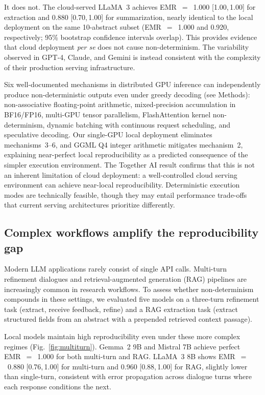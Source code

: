 \documentclass[sn-nature]{sn-jnl}
\begin{document}
It does not.
The cloud-served LLaMA~3 achieves EMR~$=$~1.000 [1.00,\,1.00] for extraction and 0.880 [0.70,\,1.00] for summarization, nearly identical to the local deployment on the same 10-abstract subset (EMR~$=$~1.000 and 0.920, respectively; 95\% bootstrap confidence intervals overlap).
This provides evidence that cloud deployment \emph{per se} does not cause non-determinism. The variability observed in GPT-4, Claude, and Gemini is instead consistent with the complexity of their production serving infrastructure.

Six well-documented mechanisms in distributed GPU inference can independently produce non-deterministic outputs even under greedy decoding (see Methods): non-associative floating-point arithmetic\cite{higham2002accuracy}, mixed-precision accumulation in BF16/FP16\cite{yuan2025nondeterminism}, multi-GPU tensor parallelism\cite{shoeybi2019megatron}, FlashAttention kernel non-determinism\cite{dao2022flashattention}, dynamic batching with continuous request scheduling\cite{kwon2023vllm}, and speculative decoding\cite{leviathan2023speculative}.
Our single-GPU local deployment eliminates mechanisms~3--6, and GGML Q4 integer arithmetic mitigates mechanism~2, explaining near-perfect local reproducibility as a predicted consequence of the simpler execution environment.
The Together AI result confirms that this is not an inherent limitation of cloud deployment: a well-controlled cloud serving environment can achieve near-local reproducibility.
Deterministic execution modes are technically feasible, though they may entail performance trade-offs that current serving architectures prioritize differently.


\subsection{Complex workflows amplify the reproducibility gap}\label{subsec:multiturn}

Modern LLM applications rarely consist of single API calls.
Multi-turn refinement dialogues and retrieval-augmented generation (RAG) pipelines are increasingly common in research workflows.
To assess whether non-determinism compounds in these settings, we evaluated five models on a three-turn refinement task (extract, receive feedback, refine) and a RAG extraction task (extract structured fields from an abstract with a prepended retrieved context passage).

Local models maintain high reproducibility even under these more complex regimes (Fig.~\ref{fig:multiturn}).
Gemma~2 9B and Mistral 7B achieve perfect EMR~$=$~1.000 for both multi-turn and RAG.
LLaMA~3 8B shows EMR~$=$~0.880 [0.76,\,1.00] for multi-turn and 0.960 [0.88,\,1.00] for RAG, slightly lower than single-turn, consistent with error propagation across dialogue turns where each response conditions the next.
\end{document}
